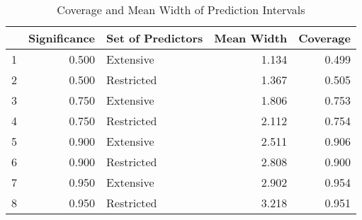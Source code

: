 \begin{table}[ht]
\centering
\begin{tabular}{rrlrr}
  \toprule
 & Significance & Set of Predictors & Mean Width & Coverage \\ 
  \midrule
1 & 0.500 & Extensive & 1.134 & 0.499 \\ 
  2 & 0.500 & Restricted & 1.367 & 0.505 \\ 
  3 & 0.750 & Extensive & 1.806 & 0.753 \\ 
  4 & 0.750 & Restricted & 2.112 & 0.754 \\ 
  5 & 0.900 & Extensive & 2.511 & 0.906 \\ 
  6 & 0.900 & Restricted & 2.808 & 0.900 \\ 
  7 & 0.950 & Extensive & 2.902 & 0.954 \\ 
  8 & 0.950 & Restricted & 3.218 & 0.951 \\ 
   \bottomrule
\end{tabular}
\caption{Coverage and Mean Width of Prediction Intervals} 
\end{table}
